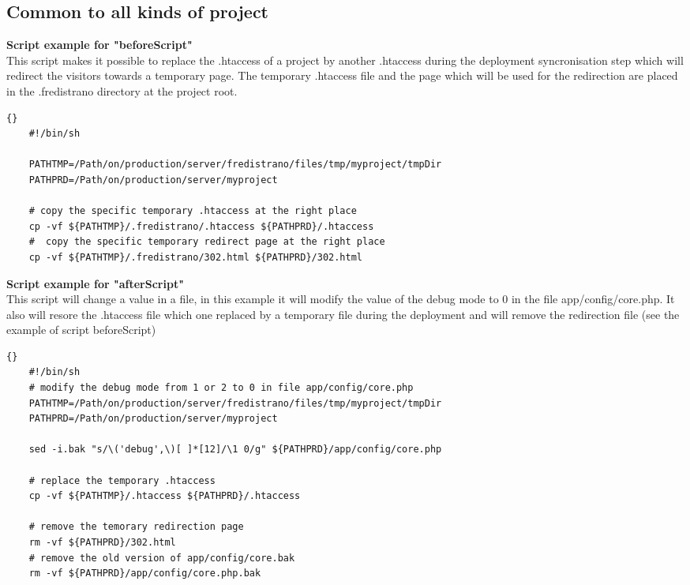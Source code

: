\documentclass[12pt,a4paper]{report}
\begin{document}
\subsection{Common to all kinds of project} %
\begin{list}{-}{}
\item \textbf{Script example for "beforeScript"}\\
This script makes it possible to replace the .htaccess of a project by another .htaccess during the deployment syncronisation step which will redirect the visitors towards a temporary page. The temporary .htaccess file and the page which will be used for the redirection are placed in the .fredistrano directory at the project root.

	\lstset{language=bash}
	\lstset{breaklines=true}
	\lstset{tabsize=1}
	\begin{lstlisting}[frame=tb]{}
	#!/bin/sh

	PATHTMP=/Path/on/production/server/fredistrano/files/tmp/myproject/tmpDir
	PATHPRD=/Path/on/production/server/myproject

	# copy the specific temporary .htaccess at the right place 
	cp -vf ${PATHTMP}/.fredistrano/.htaccess ${PATHPRD}/.htaccess
	#  copy the specific temporary redirect page at the right place 
	cp -vf ${PATHTMP}/.fredistrano/302.html ${PATHPRD}/302.html
	\end{lstlisting}

\item \textbf{Script example for "afterScript"}\\
This script will change a value in a file, in this example it will modify the value of the debug mode to 0 in the file app/config/core.php. It also will resore the .htaccess file which one replaced by a temporary file during the deployment and will remove the redirection file (see the example of script beforeScript)
	\lstset{language=bash}
	\lstset{breaklines=true}
	\lstset{tabsize=1}
	\begin{lstlisting}[frame=tb]{}
	#!/bin/sh
	# modify the debug mode from 1 or 2 to 0 in file app/config/core.php
	PATHTMP=/Path/on/production/server/fredistrano/files/tmp/myproject/tmpDir
	PATHPRD=/Path/on/production/server/myproject

	sed -i.bak "s/\('debug',\)[ ]*[12]/\1 0/g" ${PATHPRD}/app/config/core.php

	# replace the temporary .htaccess 
	cp -vf ${PATHTMP}/.htaccess ${PATHPRD}/.htaccess

	# remove the temorary redirection page 
	rm -vf ${PATHPRD}/302.html
	# remove the old version of app/config/core.bak
	rm -vf ${PATHPRD}/app/config/core.php.bak
	\end{lstlisting}


\end{list}
\end{document}
